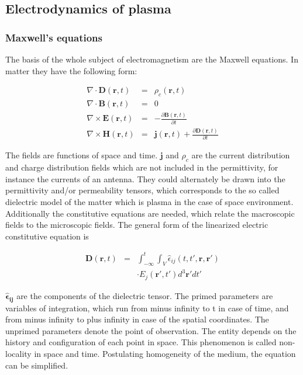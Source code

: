 \documentclass[draft,ras]{agutex}
\begin{document}
\begin{article}
\subsection{Electrodynamics of plasma}
\subsubsection{Maxwell's equations}
The basis of the whole subject of electromagnetism are the Maxwell
equations. In matter they have the following form:

\begin{eqnarray}
\nabla \cdot \mathbf{D}(\mathbf{r},t)&=&\rho_c(\mathbf{r},t) \label{maxwell1}\\
\nabla \cdot \mathbf{B}(\mathbf{r},t)&=&0 \label{maxwell2} \\
\nabla \times \mathbf{E}(\mathbf{r},t)&=&-\frac{\partial \mathbf{B}(\mathbf{r},t)}{\partial t} \label{maxwell3} \\
\nabla \times \mathbf{H}(\mathbf{r},t)&=&\mathbf{j}(\mathbf{r},t)+ \frac{\partial \mathbf{D}(\mathbf{r},t)}{\partial t} \label{maxwell4}
\end{eqnarray}

The fields are functions of space and time. $\mathbf{j}$ and
$\rho_c$ are the current distribution and charge distribution fields
which are not included in the permittivity, for instance the currents of an antenna. They could alternately be drawn into the permittivity and/or permeability tensors, which corresponds to the so called dielectric model of the matter which is plasma in the case of space environment.
Additionally the constitutive equations are needed, which relate the
macroscopic fields to the microscopic fields. The general form of the linearized electric constitutive equation is

\begin{eqnarray}
    \mathbf{D}(\mathbf{r},t)&=&\int_{-\infty}^t\int_V\hat{\epsilon}_{ij}(t,t',\mathbf{r},\mathbf{r'}) \\
&&\cdot E_j(\mathbf{r'},t')d^3\mathbf{r'}dt'\nonumber
\end{eqnarray}

$\mathbf{\hat{\epsilon}_{ij}}$ are the components of the dielectric tensor. The primed parameters are  variables of integration, which run from minus infinity to t in case of time, and from minus infinity to plus infinity in case of the spatial coordinates. The unprimed parameters denote the point of observation. The entity depends on the history and configuration of each point in space. This phenomenon is called non-locality in space and time. Postulating homogeneity of the medium, the equation can be simplified.


\end{article}
\end{document}
